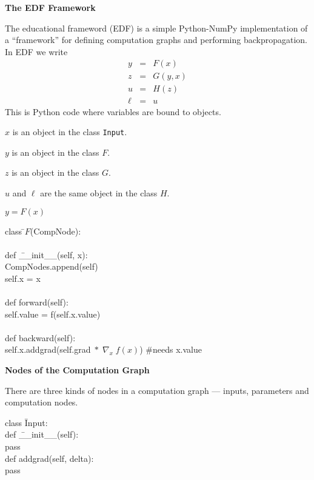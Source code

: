 \documentclass[landscape]{article}
\newcommand{\slide}[1]{
  \vfill
  \centerline{\Large\thepage}
  \eject
  \centerline{\bf #1}
  \vfill}
\newcommand{\anaslide}[1]{
  \vfill
  \centerline{\Large\thepage}
  \eject \centerline{\bf #1}}
\newcommand{\anaslideplain}[1]{
  \vfill
  \eject
  \centerline{\bf #1}}
\begin{document}
{\anaslide{The EDF Framework}

The educational frameword (EDF) is a simple Python-NumPy implementation of a ``framework'' for defining computation graphs
and performing backpropagation. In EDF we write
\begin{eqnarray*}
  y & = & F(x) \\
  z & = & G(y,x) \\
  u & = & H(z) \\
  \ell &  = &  u
\end{eqnarray*}
\medskip
This is Python code where variables are bound to objects.

\medskip
$x$ is an object in the class {\tt Input}.

\medskip
$y$ is an object in the class $F$.

\medskip
$z$ is an object in the class $G$.

\medskip
$u$ and $\ell$ are the same object in the class $H$.

\anaslideplain{$y = F(x)$}

\begin{tabbing}
  class \=$F$(CompNode): \\
  \\
    \>def \=\_\_init\_\_(self, x): \\
        \>\>CompNodes.append(self) \\
        \>\>self.x = x \\
\\
    \>def forward(self): \\
        \>\>self.value = f(self.x.value) \\
\\
    \>def backward(self): \\
        \>\>self.x.addgrad(self.grad$ \;*\; \nabla_x\;f(x)$) \hspace{2em} \#needs x.value
\end{tabbing}

\slide{Nodes of the Computation Graph}

There are three kinds of nodes in a computation graph --- inputs, parameters and computation nodes.

\vfill
\begin{tabbing}
class \=Input: \\
    \>def \=\_\_init\_\_(self): \\
        \>\>pass \\
    \>def \>addgrad(self, delta): \\
    \>\>pass
\end{tabbing}

}
\end{document}
